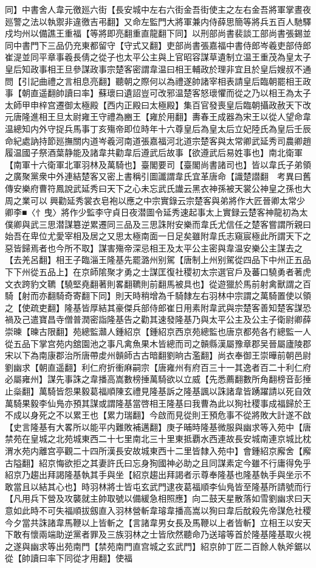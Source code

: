 同】中書舍人韋元徼廵六街【長安城中左右六街金吾街使主之左右金吾將軍掌晝夜廵警之法以執禦非違徼吉弔翻】又命左監門大將軍兼内侍薛思簡等將兵五百人馳驛戍均州以備譙王重福【等將即亮翻重直龍翻下同】以刑部尚書裴談工部尚書張錫並同中書門下三品仍充東都留守【守式又翻】吏部尚書張嘉福中書侍郎岑羲吏部侍郎崔湜並同平章事羲長倩之從子也太平公主與上官昭容謀草遺制立温王重茂為皇太子皇后知政事相王旦參謀政事宗楚客密謂韋温曰相王輔政於理非宜且於皇后嫂叔不通問【引記曲禮之言相息亮翻】聽朝之際何以為禮遂帥諸宰相表請皇后臨朝罷相王政事【朝直遥翻帥讀曰率】蘇瓌曰遺詔豈可改邪温楚客怒瓌懼而從之乃以相王為太子太師甲申梓宫遷御太極殿【西内正殿曰太極殿】集百官發喪皇后臨朝攝政赦天下改元唐隆進相王旦太尉雍王守禮為豳王【雍於用翻】夀春王成器為宋王以從人望命韋温總知内外守捉兵馬事丁亥殤帝即位時年十六尊皇后為皇太后立妃陸氏為皇后壬辰命紀處訥持節廵撫關内道岑羲河南道張嘉福河北道宗楚客與太常卿武延秀司農卿趙履温國子祭酒葉静能及諸韋共勸韋后遵武后故事【欲遵武后易姓事也】南北衛軍【南軍十六衛軍北軍羽林及萬騎也】臺閣要司【臺閣尚書諸司也】皆以韋氏子弟領之廣聚黨衆中外連結楚客又密上書稱引圖讖謂韋氏宜革唐命【識楚譛翻　考異曰舊傳安樂府曹符鳳說武延秀曰天下之心未忘武氏䜟云黑衣神孫被天裳公神皇之孫也大周之業可以興勸延秀裳衣皂袍以應之中宗實錄云宗楚客與弟將作大匠晉卿太常少卿李■〈忄曳〉將作少監李守貞日夜潜圖令延秀速起事太上實録云楚客神龍初為太僕卿與武三思潜謀簒逆累遷同三品及三思誅附安樂而韋氏尤信任之楚客嘗謂所親曰始吾在卑位尤愛宰相及居之又思太極南面一日足矣雖附韋氏志窺宸極此所謂天下之惡皆歸焉者也今所不取】謀害殤帝深忌相王及太平公主密與韋温安樂公主謀去之【去羌呂翻】相王子臨淄王隆基先罷潞州别駕【唐制上州别駕從四品下中州正五品下下州從五品上】在京師隂聚才勇之士謀匡復社稷初太宗選官戶及蕃口驍勇者著虎文衣跨豹文韀【驍堅堯翻著則畧翻韀則前翻馬被具也】從遊獵於馬前射禽獸謂之百騎【射而亦翻騎奇寄翻下同】則天時稍增為千騎隸左右羽林中宗謂之萬騎置使以領之【使疏吏翻】隆基皆厚結其豪傑兵部侍郎崔日用素附韋武與宗楚客善知楚客謀恐禍及己遣寶昌寺僧普潤密詣隆基告之勸其速發隆基乃與太平公主及公主子衛尉卿薛崇暕【暕古限翻】苑總監灨人鍾紹京【鍾紹京西京苑總監也唐京都苑各冇總監一人從五品下掌宫苑内舘園池之事凡禽魚果木皆總而司之贑縣漢屬豫章郡吴晉屬廬陵郡宋以下為南康郡治所唐帶䖍州贑師古古暗翻劉晌古濫翻】尚衣奉御王崇曄前朝邑尉劉幽求【朝直遥翻】利仁府折衝麻嗣宗【唐雍州有府百三十一其逸者百二十利仁府必屬雍州】謀先事誅之韋播高嵩數榜捶萬騎欲以立威【先悉薦翻數所角翻榜音彭捶止橤翻】萬騎皆怨果毅葛福順陳玄禮見隆基訴之隆基諷以誅諸韋皆踴躍請以死自效萬騎果毅李仙鳬亦預其謀或謂隆基當啓相王隆基曰我曹為此以狥社稷事成福歸於王不成以身死之不以累王也【累力瑞翻】今啟而見從則王預危事不從將敗大計遂不啟【史言隆基有大畧所以能平内難敗補邁翻】庚子晡時隆基微服與幽求等入苑中【唐禁苑在皇城之北苑城東西二十七里南北三十里東抵覇水西連故長安城南連京城比枕渭水苑内離宫亭觀二十四所漢長安故城東西十二里皆隸入苑中】會鍾紹京廨舍【廨古隘翻】紹京悔欲拒之其妻許氏曰忘身狥國神必助之且同謀素定今雖不行庸得免乎紹京乃趨出拜謁隆基執其手與坐【紹京趨出拜謁者示尊奉隆基也隆基執手與坐示不敢當且以結其心也】時羽林將士皆屯玄武門逮夜葛福順李仙鳬皆至隆基所請號而行【凡用兵下營及攻襲就主帥取號以備緩急相照應】向二鼓天星散落如雪劉幽求曰天意如此時不可失福順拔劔直入羽林營斬韋璿韋播高嵩以狥曰韋后酖殺先帝謀危社稷今夕當共誅諸韋馬鞭以上皆斬之【言諸韋男女長及馬鞭以上者皆斬】立相王以安天下敢有懷兩端助逆黨者罪及三族羽林之士皆欣然聽命乃送璿等首於隆基隆基取火視之遂與幽求等出苑南門【禁苑南門直宫城之玄武門】紹京帥丁匠二百餘人執斧鋸以從【帥讀曰率下同從才用翻】使福